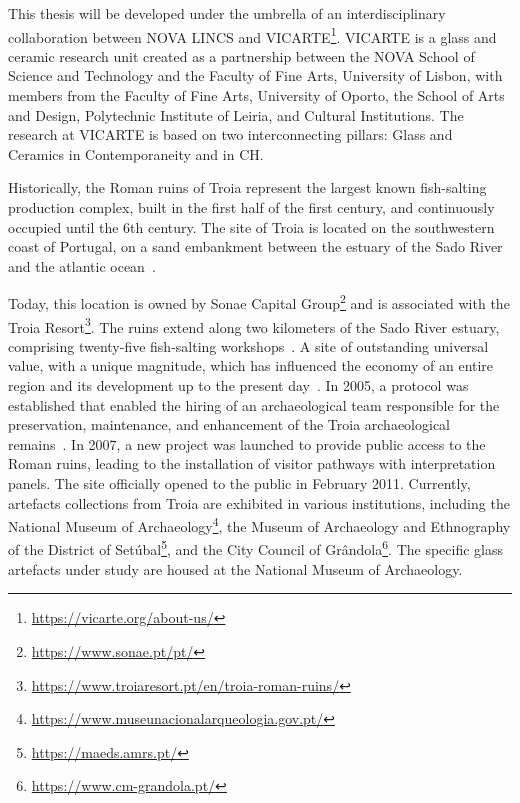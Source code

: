 This thesis will be developed under the umbrella of an interdisciplinary collaboration between NOVA LINCS and \gls{VICARTE}\footnote{\url{https://vicarte.org/about-us/}}.
\gls{VICARTE} is a glass and ceramic research unit created as a partnership between the NOVA School of Science and Technology and the Faculty of Fine Arts, University of Lisbon, with members from the Faculty of Fine Arts, University of Oporto, the School of Arts and Design, Polytechnic Institute of Leiria, and Cultural Institutions.
The research at \gls{VICARTE} is based on two interconnecting pillars: Glass and Ceramics in Contemporaneity and in \gls{CH}. 

Historically, the Roman ruins of Troia represent the largest known fish-salting production complex, built in the first half of the first century, and continuously occupied until the 6th century. 
The site of Troia is located on the southwestern coast of Portugal, on a sand embankment between the estuary of the Sado River and the atlantic ocean~\cite{pinto2018reassessment}.

Today, this location is owned by Sonae Capital Group\footnote{\url{https://www.sonae.pt/pt/}} and is associated with the Troia Resort\footnote{\url{https://www.troiaresort.pt/en/troia-roman-ruins/}}.
The ruins extend along two kilometers of the Sado River estuary, comprising twenty-five fish-salting workshops~\cite{hocquet2015fish}.
A site of outstanding  universal value, with a unique magnitude, which has influenced the economy of an entire region and its development up to the present day~\cite{unesco_troia}.
In 2005, a protocol was established that enabled the hiring of an archaeological team responsible for the preservation, maintenance, and enhancement of the Troia archaeological remains~\cite{pinto2014ruinas}. In 2007,
a new project was launched to provide public access to the Roman ruins, leading to the installation of visitor pathways with interpretation panels. The site officially opened to the public in February 2011. 
Currently, artefacts collections from Troia are exhibited in various institutions, including the National Museum of Archaeology\footnote{\url{https://www.museunacionalarqueologia.gov.pt/}}, the Museum of Archaeology and Ethnography of the District of Setúbal\footnote{\url{https://maeds.amrs.pt/}}, and the City Council of Grândola\footnote{\url{https://www.cm-grandola.pt/}}. The specific glass artefacts under study are housed at the National Museum of Archaeology.




